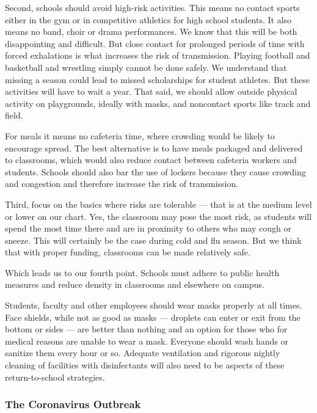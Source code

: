 Second, schools should avoid high-risk activities. This means no contact
sports either in the gym or in competitive athletics for high school
students. It also means no band, choir or drama performances. We know
that this will be both disappointing and difficult. But close contact
for prolonged periods of time with forced exhalations is what increases
the risk of transmission. Playing football and basketball and wrestling
simply cannot be done safely. We understand that missing a season could
lead to missed scholarships for student athletes. But these activities
will have to wait a year. That said, we should allow outside physical
activity on playgrounds, ideally with masks, and noncontact sports like
track and field.

For meals it means no cafeteria time, where crowding would be likely to
encourage spread. The best alternative is to have meals packaged and
delivered to classrooms, which would also reduce contact between
cafeteria workers and students. Schools should also bar the use of
lockers because they cause crowding and congestion and therefore
increase the risk of transmission.

Third, focus on the basics where risks are tolerable --- that is at the
medium level or lower on our chart. Yes, the classroom may pose the most
risk, as students will spend the most time there and are in proximity to
others who may cough or sneeze. This will certainly be the case during
cold and flu season. But we think that with proper funding, classrooms
can be made relatively safe.

Which leads us to our fourth point. Schools must adhere to public health
measures and reduce density in classrooms and elsewhere on campus.

Students, faculty and other employees should wear masks properly at all
times. Face shields, while not as good as masks --- droplets can enter
or exit from the bottom or sides --- are better than nothing and an
option for those who for medical reasons are unable to wear a mask.
Everyone should wash hands or sanitize them every hour or so. Adequate
ventilation and rigorous nightly cleaning of facilities with
disinfectants will also need to be aspects of these return-to-school
strategies.

\hypertarget{the-coronavirus-outbreak}{%
\subsubsection{The Coronavirus
Outbreak}\label{the-coronavirus-outbreak}}

